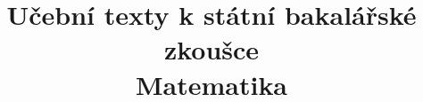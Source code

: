 \clearpage

\clearpage

\title{\LARGE Učební texty k státní bakalářské zkoušce \\ Matematika}




\maketitle

\clearpage

\clearpage

\tableofcontents


\newpage

\newpage

\newpage

\newpage

\newpage

\newpage

\newpage

\newpage

\newpage

\newpage

\newpage

\newpage

\newpage

\newpage

\newpage

\newpage

\newpage



